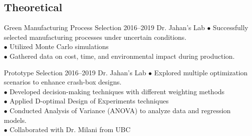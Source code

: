 \documentclass[
	a4paper,
]{ThirtyNinesecondscv}
\begin{document}
\subsection{Theoretical}
    \begin{cvtable}[1.5]
	\customcvitem
                {\faUniversity}
                {Green Manufacturing Process Selection}
                {2016--2019}
                {Dr.  Jahan's Lab}
                {$\bullet$ Successfully selected manufacturing processes under uncertain conditions. \\
	$\bullet$ Utilized Monte Carlo simulations\\
	$\bullet$  Gathered data on cost, time, and environmental impact during production.\\
}

	\customcvitem
                {\faUniversity}
                {Prototype Selection}
                {2016--2019}
                {Dr.  Jahan's Lab}
                {
                $\bullet$ Explored multiple optimization scenarios to enhance crash-box designs.\\
	       	$\bullet$ Developed decision-making techniques with different      weighting methods\\%
		      $\bullet$ Applied D-optimal Design of Experiments techniques \\
		      $\bullet$ Conducted Analysis of Variance (ANOVA) to analyze data and regression models. \\
		$\bullet$ Collaborated with Dr. Milani from UBC \\
	}
\end{cvtable}

{}
\end{document}
